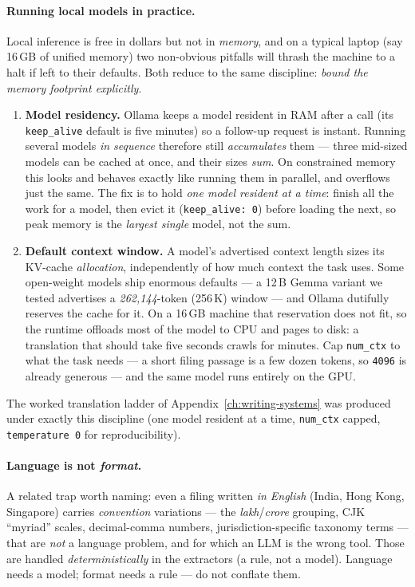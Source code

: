 \documentclass[11pt,a4paper]{report}
\begin{document}
\paragraph{Running local models in practice.} Local inference is free in dollars but not in \emph{memory}, and
on a typical laptop (say 16\,GB of unified memory) two non-obvious pitfalls will thrash the machine to a halt
if left to their defaults. Both reduce to the same discipline: \emph{bound the memory footprint explicitly}.
\begin{enumerate}
  \item \textbf{Model residency.} Ollama keeps a model resident in RAM after a call (its \texttt{keep\_alive}
  default is five minutes) so a follow-up request is instant. Running several models \emph{in sequence} therefore
  still \emph{accumulates} them --- three mid-sized models can be cached at once, and their sizes \emph{sum}. On
  constrained memory this looks and behaves exactly like running them in parallel, and overflows just the same.
  The fix is to hold \emph{one model resident at a time}: finish all the work for a model, then evict it
  (\texttt{keep\_alive:\,0}) before loading the next, so peak memory is the \emph{largest single} model, not the
  sum.
  \item \textbf{Default context window.} A model's advertised context length sizes its KV-cache \emph{allocation},
  independently of how much context the task uses. Some open-weight models ship enormous defaults --- a 12\,B
  Gemma variant we tested advertises a \emph{262{,}144}-token (256\,K) window --- and Ollama dutifully reserves
  the cache for it. On a 16\,GB machine that reservation does not fit, so the runtime offloads most of the model
  to CPU and pages to disk: a translation that should take five seconds crawls for minutes. Cap \texttt{num\_ctx}
  to what the task needs --- a short filing passage is a few dozen tokens, so \texttt{4096} is already generous
  --- and the same model runs entirely on the GPU.
\end{enumerate}
\noindent The worked translation ladder of Appendix~\ref{ch:writing-systems} was produced under exactly this
discipline (one model resident at a time, \texttt{num\_ctx} capped, \texttt{temperature\,0} for reproducibility).

\paragraph{Language is not \emph{format}.} A related trap worth naming: even a filing written \emph{in English}
(India, Hong Kong, Singapore) carries \emph{convention} variations --- the \emph{lakh}/\emph{crore} grouping,
CJK ``myriad'' scales, decimal-comma numbers, jurisdiction-specific taxonomy terms --- that are \emph{not} a
language problem, and for which an LLM is the wrong tool. Those are handled \emph{deterministically} in the
extractors (a rule, not a model). Language needs a model; format needs a rule --- do not conflate them.
\end{document}
